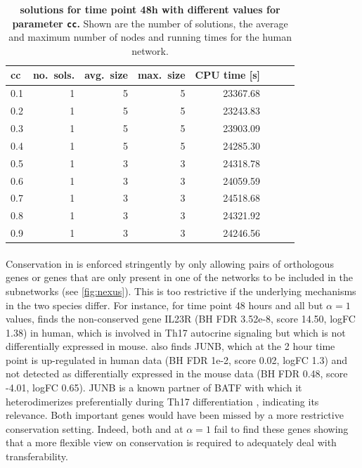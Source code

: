 \begin{table}[h]
	\caption[\nexus{} solutions for time point \unit{48}{h} with different values for parameter \texttt{cc}]{\textbf{\nexus{} solutions for time point \unit{48}{h} with
    different values for parameter \texttt{cc}.} Shown are  the number of solutions, the average and maximum number of nodes and running times for the human network.}
\begin{center}
\tabcolsep=0.08cm
\begin{tabular}{lrrrrrrr}
\hline
cc & no.\ sols. & avg.\ size & max.\ size& CPU time [s] \\ \hline
0.1 & 1 & 5 & 5 & 23367.68\\
0.2 & 1 & 5 & 5 & 23243.83\\
0.3 & 1 & 5 & 5 & 23903.09\\
0.4 & 1 & 5 & 5 & 24285.30\\
0.5 & 1 & 3 & 3 & 24318.78\\
0.6 & 1 & 3 & 3 & 24059.59\\
0.7 & 1 & 3 & 3 & 24518.68\\
0.8 & 1 & 3 & 3 & 24321.92\\
0.9 & 1 & 3 & 3 & 24246.56\\ \hline
\end{tabular}
\end{center}
\label{tab:cc}
\end{table}

\paragraph{}
Conservation in \nexus{} is enforced stringently by only allowing pairs of orthologous genes or genes that are only present in one of the networks to be included in the subnetworks (see \cref{fig:nexus}).
This is too restrictive if the underlying mechanisms in the two species differ.
For instance, for time point 48 hours and all but $\alpha=1$ values, \xheinz{} finds the non-conserved gene IL23R (BH FDR 3.52e-8, score 14.50, logFC 1.38) in human, which is involved in Th17 autocrine signaling \parencite{wei200721} but which is not differentially expressed in mouse.
\xheinz{} also finds JUNB, which at the 2 hour time point is up-regulated in human data (BH FDR 1e-2, score 0.02, logFC 1.3) and not detected as differentially expressed in the mouse data (BH FDR 0.48, score -4.01, logFC 0.65).
JUNB is a known partner of BATF with which it heterodimerizes preferentially during Th17 differentiation \parencite{schraml2009ap}, indicating its relevance.
Both important genes would have been missed by a more restrictive conservation setting.
Indeed, both \nexus{} and \xheinz{} at $\alpha = 1$ fail to find these genes showing that a more flexible view on conservation is required to adequately deal with transferability.

